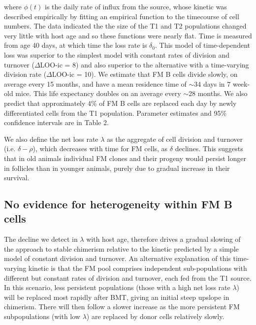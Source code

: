 \documentclass[11pt]{article}
\begin{document}
	where $\phi(t)$ is the daily rate of influx from the source, whose kinetic was described empirically by fitting an empirical function to the timecourse of cell numbers. The data indicated the the size of the T1 and T2 populations  changed very little with host age and so these functions were nearly flat. Time is measured from age 40 days, at which time the loss rate is $\delta_{0}$. This model of time-dependent loss was superior to the simplest model with constant rates of division and turnover ($\Delta$LOO-ic = 8) and also superior to the alternative with a time-varying division rate ($\Delta$LOO-ic = 10). We estimate that FM B cells divide slowly, on average every 15 months,  and have a mean residence time of $\sim$34 days in 7 week-old mice. This life expectancy doubles on an average every $\sim$28 months.
	We also predict that approximately 4\% of FM B cells are replaced each day by newly differentiated cells from the T1 population. Parameter estimates and 95\% confidence intervals are in Table 2.
	
	We also define the net loss rate $\lambda$ as the aggregate of cell division and turnover (i.e. $\delta - \rho$), which decreases with time for FM cells, as $\delta$ declines.
	This suggests that in old animals individual FM clones and their progeny would persist longer in follicles than in younger animals, purely due to gradual increase in their survival.
	
	\subsection*{No evidence for  heterogeneity within FM B cells}
	
	The decline we detect in $\lambda$ with host age, %
	therefore drives a gradual slowing of the approach to stable chimerism relative to the kinetic predicted by a simple model of constant division and turnover. An alternative explanation of this time-varying kinetic is that the FM pool comprises independent sub-populations with different but constant rates of division and turnover, each fed from the T1 source.  In this scenario, less persistent populations (those with a high net loss rate $\lambda$) will be replaced most rapidly after BMT, giving an initial steep upslope in chimerism. There will then follow a slower increase as the more persistent FM subpopulations (with low $\lambda$) are replaced by donor cells relatively slowly.
	
\end{document}
